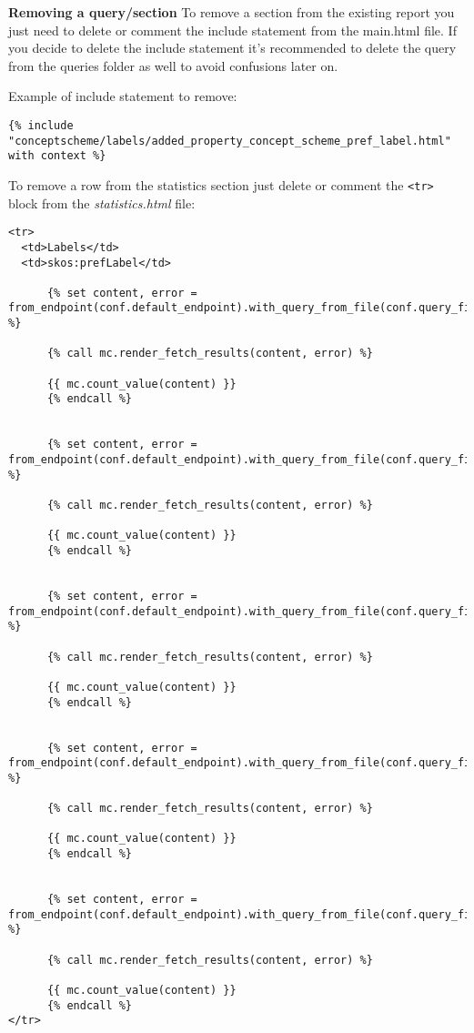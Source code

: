 \textbf{Removing a query/section}
To remove a section from the existing report you just need to delete or comment the include statement from the main.html file. If you decide to delete the include statement it's recommended to delete the query from the queries folder as well to avoid confusions later on.

Example of include statement to remove:
\begin{lstlisting}
{% include "conceptscheme/labels/added_property_concept_scheme_pref_label.html" with context %}
\end{lstlisting}

To remove a row from the statistics section just delete or comment the \texttt{<tr>} block from the \textit{statistics.html} file:
\begin{lstlisting}
<tr>
  <td>Labels</td>
  <td>skos:prefLabel</td>
  
      {% set content, error = from_endpoint(conf.default_endpoint).with_query_from_file(conf.query_files["count_added_property_concept_scheme_pref_label.rq"]).fetch_tabular() %}
      
      {% call mc.render_fetch_results(content, error) %}

      {{ mc.count_value(content) }}
      {% endcall %}
      
  
      {% set content, error = from_endpoint(conf.default_endpoint).with_query_from_file(conf.query_files["count_deleted_property_concept_scheme_pref_label.rq"]).fetch_tabular() %}
      
      {% call mc.render_fetch_results(content, error) %}

      {{ mc.count_value(content) }}
      {% endcall %}
      
  
      {% set content, error = from_endpoint(conf.default_endpoint).with_query_from_file(conf.query_files["count_updated_property_concept_scheme_pref_label.rq"]).fetch_tabular() %}
      
      {% call mc.render_fetch_results(content, error) %}

      {{ mc.count_value(content) }}
      {% endcall %}
      
  
      {% set content, error = from_endpoint(conf.default_endpoint).with_query_from_file(conf.query_files["count_moved_property_concept_scheme_pref_label.rq"]).fetch_tabular() %}
      
      {% call mc.render_fetch_results(content, error) %}

      {{ mc.count_value(content) }}
      {% endcall %}
      
  
      {% set content, error = from_endpoint(conf.default_endpoint).with_query_from_file(conf.query_files["count_changed_property_concept_scheme_pref_label.rq"]).fetch_tabular() %}
      
      {% call mc.render_fetch_results(content, error) %}

      {{ mc.count_value(content) }}
      {% endcall %}
</tr>
\end{lstlisting}

